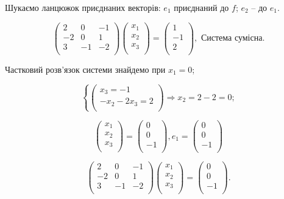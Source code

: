 Шукаємо ланцюжок приєднаних векторів: $e_1$ приєднаний до $f$; $e_2$ -- до $e_1$.

$$\begin{pmatrix}
	2  & 0  & -1 \\
	-2 & 0  & 1  \\
	3  & -1 & -2 \\
\end{pmatrix} \begin{pmatrix}
	x_1 \\
	x_2 \\
	x_3 \\
\end{pmatrix} = \begin{pmatrix}
	1 \\
	-1 \\
	2 \\
\end{pmatrix}, \text{ Система сумісна}.$$

Частковий розв’язок системи знайдемо при $x_1 = 0$;

$$\left\{ \begin{pmatrix}
	x_3 = -1 \\
	-x_2 - 2 x_3 = 2 \\
\end{pmatrix} \right. \Rightarrow x_2 = 2 - 2 = 0; $$

$$\begin{pmatrix}
	x_1 \\
	x_2 \\
	x_3 \\
\end{pmatrix} = \begin{pmatrix}
	0 \\
	0 \\
	-1 \\
\end{pmatrix},  e_1 = \begin{pmatrix}
	0 \\
	0 \\
	-1 \\
\end{pmatrix} $$

$$\begin{pmatrix}
	2  & 0  & -1 \\
	-2 & 0  & 1  \\
	3  & -1 & -2 \\
\end{pmatrix} \begin{pmatrix}
	x_1 \\
	x_2 \\
	x_3 \\
\end{pmatrix} = \begin{pmatrix}
	0 \\
	0 \\
	-1 \\
\end{pmatrix}.$$

